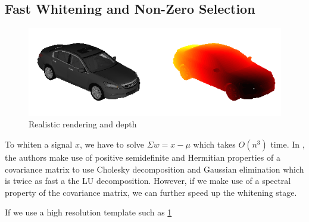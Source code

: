 \documentclass[10pt,twocolumn,letterpaper]{article}
\begin{document}
\subsection{Fast Whitening and Non-Zero Selection}
\label{sec:fast_whitening}
\begin{figure}[t]
  \begin{center}
     \includegraphics[width=0.9\linewidth]{whiten_orig_depth} 
  \end{center}
  \caption{Realistic rendering and depth}
  \label{fig:rendering}
  \end{figure}
 
To whiten a signal $x$, we have to solve $\Sigma w = x - \mu$ which takes $O(n^3)$ time. In \cite{Hariharan12}, the authors make use of positive semidefinite and Hermitian properties of a covariance matrix to use Cholesky decomposition and Gaussian elimination which is twice as fast a the LU decomposition. However, if we make use of a spectral property of the covariance matrix, we can further speed up the whitening stage.
  
  If we use a high resolution template such as \ref{fig:rendering}



\end{document}
